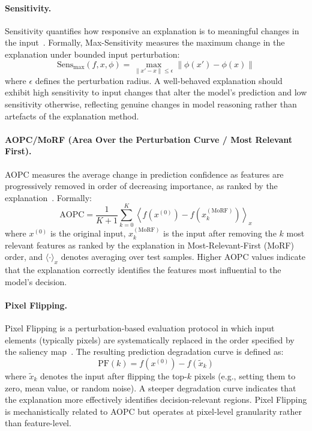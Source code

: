 \paragraph{Sensitivity.}
Sensitivity quantifies how responsive an explanation is to meaningful changes in the input~\cite{yeh2019fidelity}. Formally, Max-Sensitivity measures the maximum change in the explanation under bounded input perturbation:
\begin{equation}
\text{Sens}_{\max}(f, x, \phi) = \max_{\|x' - x\| \leq \epsilon} \|\phi(x') - \phi(x)\|
\label{eq:sensitivity}
\end{equation}
where $\epsilon$ defines the perturbation radius. A well-behaved explanation should exhibit high sensitivity to input changes that alter the model's prediction and low sensitivity otherwise, reflecting genuine changes in model reasoning rather than artefacts of the explanation method.

\paragraph{AOPC/MoRF (Area Over the Perturbation Curve / Most Relevant First).}
AOPC measures the average change in prediction confidence as features are progressively removed in order of decreasing importance, as ranked by the explanation~\cite{samek2017evaluating}. Formally:
\begin{equation}
\text{AOPC} = \frac{1}{K+1} \sum_{k=0}^{K} \left\langle f(x^{(0)}) - f(x^{(\text{MoRF})}_{k}) \right\rangle_{x}
\label{eq:aopc}
\end{equation}
where $x^{(0)}$ is the original input, $x^{(\text{MoRF})}_{k}$ is the input after removing the $k$ most relevant features as ranked by the explanation in Most-Relevant-First (MoRF) order, and $\langle \cdot \rangle_{x}$ denotes averaging over test samples. Higher AOPC values indicate that the explanation correctly identifies the features most influential to the model's decision.

\paragraph{Pixel Flipping.}
Pixel Flipping is a perturbation-based evaluation protocol in which input elements (typically pixels) are systematically replaced in the order specified by the saliency map~\cite{samek2017evaluating}. The resulting prediction degradation curve is defined as:
\begin{equation}
\text{PF}(k) = f(x^{(0)}) - f(\tilde{x}_{k})
\label{eq:pixel_flipping}
\end{equation}
where $\tilde{x}_{k}$ denotes the input after flipping the top-$k$ pixels (e.g., setting them to zero, mean value, or random noise). A steeper degradation curve indicates that the explanation more effectively identifies decision-relevant regions. Pixel Flipping is mechanistically related to AOPC but operates at pixel-level granularity rather than feature-level.

